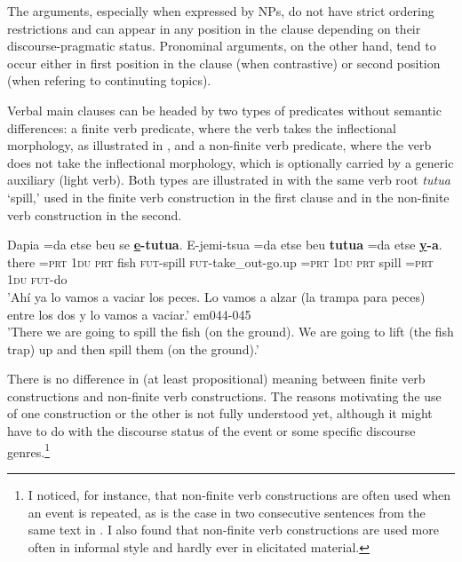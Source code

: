 \documentclass[output=paper]{langsci/langscibook}
\begin{document}
The arguments, especially when expressed by NPs, do not have strict ordering restrictions and can appear in any position in the clause depending on their discourse-pragmatic status. Pronominal arguments, on the other hand, tend to occur either in first position in the clause (when contrastive) or second position (when refering to continuting topics).

Verbal main clauses can be headed by two types of predicates without
semantic differences: a finite verb predicate,
where the verb takes the inflectional morphology, as illustrated in
, and a non-finite verb
predicate, where the verb does not take the inflectional morphology, which
is optionally carried by a generic auxiliary (light verb). Both types are
illustrated in  with the same verb root
\textit{tutua} `spill,' used in the finite verb construction in the first
clause and in the non-finite verb construction in the second.

\begin{exe}\ex
\label{ex:tacana-spill-the-fishes}
\gll Dapia  =da  etse  beu  se  \textbf{\underline{e}-tutua}.  E-jemi-tsua
=da  etse beu  \textbf{tutua}  =da  etse  \textbf{\underline{y}-a}.\\ 
    there  =\textsc{prt}  \textsc{1du}  \textsc{prt}  fish
    \textsc{fut}-spill  \textsc{fut}-take\_out-go.up  =\textsc{prt}
    1\textsc{du} \textsc{prt}  spill  =\textsc{prt}  1\textsc{du}
    \textsc{fut-}do\\ 
\glt 'Ahí ya lo vamos a vaciar los peces. Lo vamos a alzar (la trampa para peces) entre los dos y lo vamos a vaciar.’ em044-045\\
\glt 'There we are going to spill the fish (on the ground). We are going
to lift (the fish trap) up and then spill them (on the ground).'
\end{exe} 

There is no difference in (at least propositional) meaning between finite
verb constructions and non-finite verb constructions. The reasons
motivating the use of one construction or the other is not fully understood
yet, although it might have to do with the discourse status of the event or
some specific discourse genres.\footnote{I noticed, for instance, that non-finite verb constructions are often used when an event is repeated, as is the case in two consecutive sentences from the same text in . I also found that non-finite verb constructions are used more often in informal style and hardly ever in elicitated material.}
\end{document}
